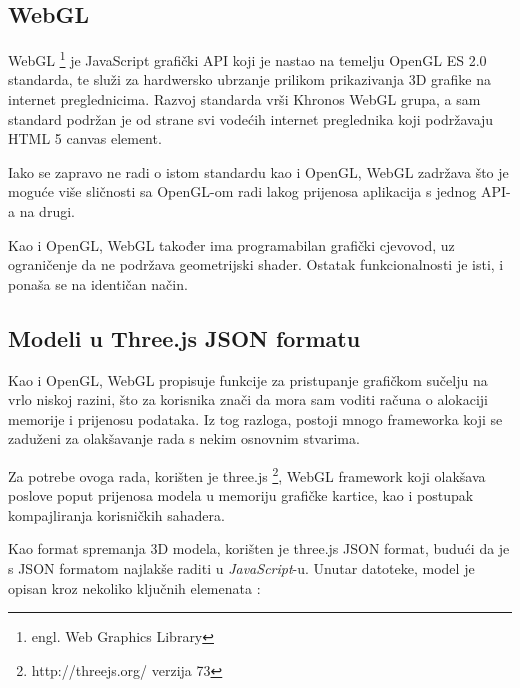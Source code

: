 \subsection{WebGL}

WebGL \footnote{engl. Web Graphics Library} je JavaScript grafički API koji je nastao na temelju OpenGL ES 2.0 standarda, te služi za hardwersko ubrzanje prilikom prikazivanja 3D grafike na internet preglednicima. Razvoj standarda vrši Khronos WebGL grupa, a sam standard podržan je od strane svi vodećih internet preglednika koji podržavaju HTML 5 canvas element.

Iako se zapravo ne radi o istom standardu kao i OpenGL, WebGL zadržava što je moguće više sličnosti sa OpenGL-om radi lakog prijenosa aplikacija s jednog API-a na drugi.

Kao i OpenGL, WebGL također ima programabilan grafički cjevovod, uz ograničenje da ne podržava geometrijski shader. Ostatak funkcionalnosti je isti, i ponaša se na identičan način.

\subsection{Modeli u Three.js JSON formatu}

Kao i OpenGL, WebGL propisuje funkcije za pristupanje grafičkom sučelju na vrlo niskoj razini, što za korisnika znači da mora sam voditi računa o alokaciji memorije i prijenosu podataka. Iz tog razloga, postoji mnogo frameworka koji se zaduženi za olakšavanje rada s nekim osnovnim stvarima.

Za potrebe ovoga rada, korišten je three.js \footnote{http://threejs.org/ verzija 73}, WebGL framework koji olakšava poslove poput prijenosa modela u memoriju grafičke kartice, kao i postupak kompajliranja korisničkih sahadera.

Kao format spremanja 3D modela, korišten je three.js JSON format, budući da je s JSON formatom najlakše raditi u \emph{JavaScript}-u. Unutar datoteke, model je opisan kroz nekoliko ključnih elemenata \cite{threejs-json}:

